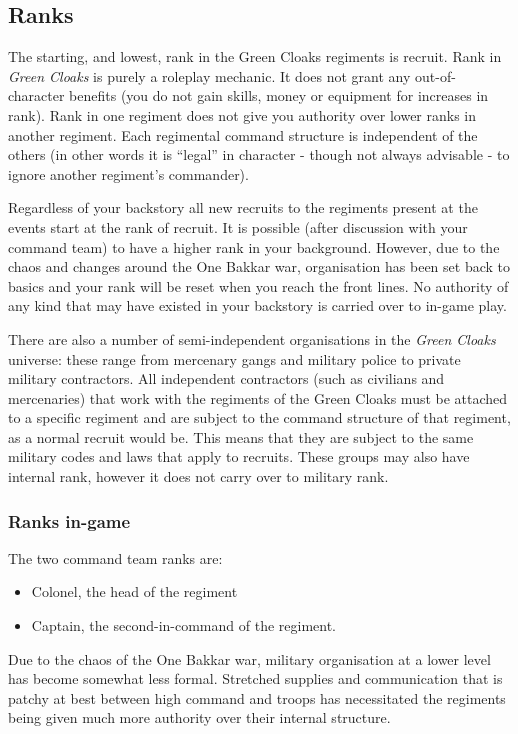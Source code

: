 \subsection{Ranks}

The starting, and lowest, rank in the Green Cloaks regiments is recruit. Rank in \textit{Green Cloaks} is purely a roleplay mechanic. It does not grant any out-of-character benefits (you do not gain skills, money or equipment for increases in rank). Rank in one regiment does not give you authority over lower ranks in another regiment. Each regimental command structure is independent of the others (in other words it is ``legal'' in character - though not always advisable - to ignore another regiment's commander).

Regardless of your backstory all new recruits to the regiments present at the events start at the rank of recruit. It is possible (after discussion with your command team) to have a higher rank in your background. However, due to the chaos and changes around the One Bakkar war, organisation has been set back to basics and your rank will be reset when you reach the front lines. No authority of any kind that may have existed in your backstory is carried over to in-game play.

There are also a number of semi-independent organisations in the \textit{Green Cloaks} universe: these range from mercenary gangs and military police to private military contractors. All independent contractors (such as civilians and mercenaries) that work with the regiments of the Green Cloaks must be attached to a specific regiment and are subject to the command structure of that regiment, as a normal recruit would be. This means that they are subject to the same military codes and laws that apply to recruits. These groups may also have internal rank, however it does not carry over to military rank.

\subsubsection{Ranks in-game}

The two command team ranks are:

\begin{itemize}
\item Colonel, the head of the regiment

\item Captain, the second-in-command of the regiment.

\end{itemize}
Due to the chaos of the One Bakkar war, military organisation at a lower level has become somewhat less formal. Stretched supplies and communication that is patchy at best between high command and troops has necessitated the regiments being given much more authority over their internal structure.

